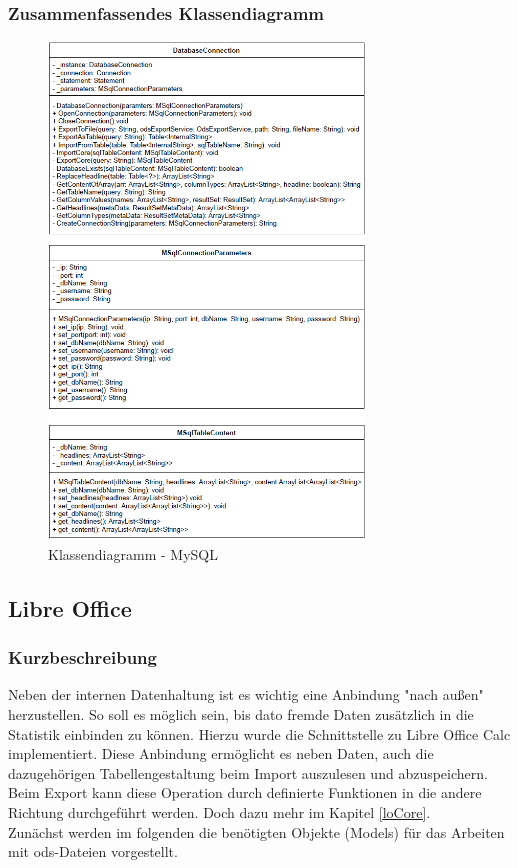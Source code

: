 \subsubsection{Zusammenfassendes Klassendiagramm}
\label{mysqlClasses}
\begin{figure}[h]
\centering
\includegraphics[width=0.75\textwidth]{"images/mysql.png"}
\caption{Klassendiagramm - MySQL}
\end{figure}

\subsection{Libre Office}
\label{subsectionLibreOffice}

\subsubsection{Kurzbeschreibung}
\label{loDescription}
Neben der internen Datenhaltung ist es wichtig eine Anbindung "nach außen" herzustellen. So soll es möglich sein, bis dato fremde Daten zusätzlich in die Statistik einbinden zu können. Hierzu wurde die Schnittstelle zu Libre Office Calc implementiert. Diese Anbindung ermöglicht es neben Daten, auch die dazugehörigen Tabellengestaltung beim Import auszulesen und abzuspeichern. Beim Export kann diese Operation durch definierte Funktionen in die andere Richtung durchgeführt werden. Doch dazu mehr im Kapitel \ref{loCore}.\\
Zunächst werden im folgenden die benötigten Objekte (Models) für das Arbeiten mit ods-Dateien vorgestellt.

